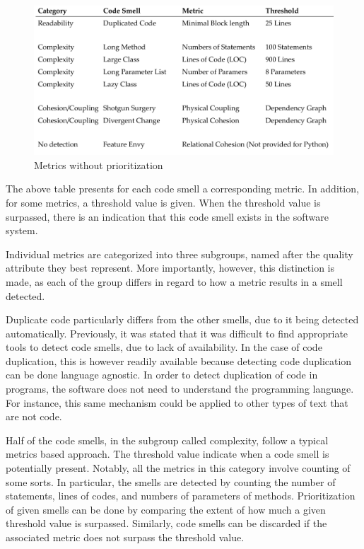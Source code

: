 \begin{figure}[htp]
    \centering
    \includegraphics[width=\textwidth]{./assets/smell_overview}
    \caption{Metrics without prioritization}
\end{figure}
The above table presents for each code smell a corresponding metric. In addition, for some metrics, a threshold value is given. When the threshold value is surpassed, there is an indication that this code smell exists in the software system.

Individual metrics are categorized into three subgroups, named after the quality attribute they best represent. More importantly, however, this distinction is made, as each of the group differs in regard to how a metric results in a smell detected. 

Duplicate code particularly differs from the other smells, due to it being detected automatically. Previously, it was stated that it was difficult to find appropriate tools to detect code smells, due to lack of availability.
In the case of code duplication, this is however readily available because detecting code duplication can be done language agnostic. In order to detect duplication of code in programs, the software does not need to understand the programming language. For instance, this same mechanism could be applied to other types of text that are not code.

Half of the code smells, in the subgroup called complexity, follow a typical metrics based approach. The threshold value indicate when a code smell is potentially present. Notably, all the metrics in this category involve counting of some sorts. In particular, the smells are detected by counting the number of statements, lines of codes, and numbers of parameters of methods. Prioritization of given smells can be done by comparing the extent of how much a given threshold value is surpassed. Similarly, code smells can be discarded if the associated metric does not surpass the threshold value. 

